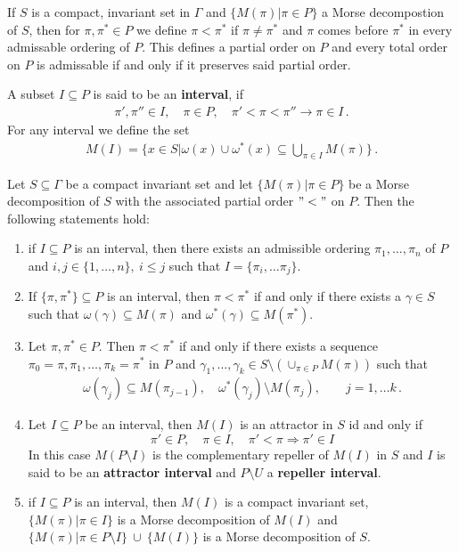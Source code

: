 \begin{cor}
	If $S$ is a compact, invariant set in $\Gamma$ and $\{M(\pi)|\pi\in P\}$ a Morse decompostion of $S$, then for $\pi,\pi^*\in P$ we define $\pi <\pi^*$ if $\pi \neq \pi^*$ and $\pi$ comes before $\pi^*$ in every admissable ordering of $P$. This defines a partial order on $P$ and every total order on $P$ is admissable if and only if it preserves said partial order. 
\end{cor}
\begin{definition}
	A subset $I\subseteq P$ is said to be an \textbf{interval}, if 
	\begin{align*}
		\pi',\pi''\in I,\quad \pi \in P,\quad \pi'<\pi<\pi''  \rightarrow \pi\in I \, .
	\end{align*} For any interval we define the set 
	\begin{align*}
		M(I)=\{ x \in S | \omega (x)\cup \omega^*(x)\subseteq \bigcup\limits_{\pi \in I}M(\pi)\}\, .
	\end{align*}
\end{definition}
\begin{prop}
	Let $S\subseteq \Gamma$ be a  compact invariant set and let $\{M(\pi)|\pi\in P\}$ be a Morse decomposition of $S$ with the associated partial order $"<"$ on $P$. Then the following statements hold:
	\begin{enumerate}
		\item if $I\subseteq P$ is an interval, then there exists an admissible ordering $\pi_1,\dots ,\pi_n$ of $P$ and $i,j\in \{1,\dots,n\},~i\leq j$ such that $I=\{ \pi_i,\dots \pi_j\}$.
		\item If $\{\pi,\pi^*\}\subseteq P$ is an interval, then $\pi<\pi^*$ if and only if there exists a $\gamma \in S$ such that $\omega(\gamma) \subseteq M(\pi)$ and $\omega^*(\gamma)\subseteq M(\pi^*)$. 
		 \item Let $\pi , \pi^*\in P$. Then $\pi < \pi^*$ if and only if there exists a sequence $\pi_0=\pi,\pi_1,\dots ,\pi_k=\pi^*$ in $P$ and $\gamma_1,\dots ,\gamma_k\in S\setminus (\cup_{\pi \in P} M(\pi))$ such that
		 \begin{align*}
		 	\omega(\gamma_j)\subseteq M(\pi_{j-1}),\quad \omega^*(\gamma_j)\setminus M(\pi_j),\quad \quad j=1,\dots k\, .
		 \end{align*}
		 \item Let $I\subseteq P$ be an interval, then $M(I)$ is an attractor in $S$ id and only if 
		 \begin{equation*}
		 	\pi'\in P,\quad \pi\in I,\quad \pi'< \pi \Rightarrow \pi'\in I
		 \end{equation*} In this case $M(P\setminus I)$ is the complementary repeller of $M(I)$ in $S$ and $I$ is said to be an \textbf{attractor interval} and $P\setminus U$ a \textbf{repeller interval}.
		 \item if $I\subseteq P$ is an interval, then $M(I)$ is a compact invariant set, $\{M(\pi)|\pi\in I\}$ is a Morse decomposition of $M(I)$ and $\{M(\pi)|\pi\in P\setminus I\}~\cup ~ \{M(I)\}$ is a Morse decomposition of $S$.
	\end{enumerate}
\end{prop}